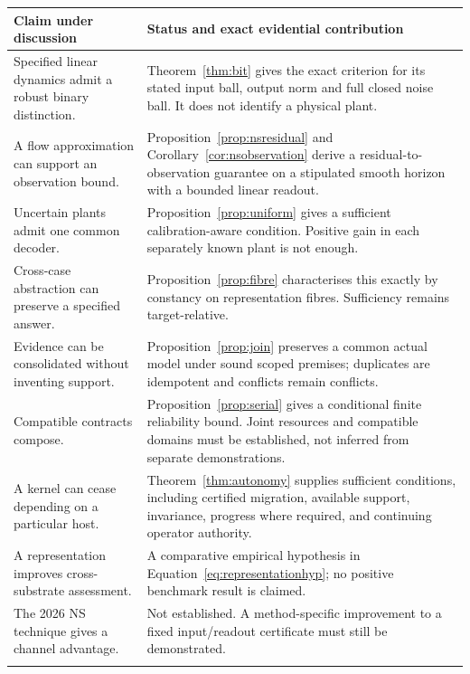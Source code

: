 \begingroup\small
\begin{longtable}{@{}>{\raggedright\arraybackslash}p{}>{\raggedright\arraybackslash}p{}@{}}
\toprule
Claim under discussion & Status and exact evidential contribution \\\midrule
\endhead
Specified linear dynamics admit a robust binary distinction. & Theorem~\ref{thm:bit} gives the exact criterion for its stated input ball, output norm and full closed noise ball. It does not identify a physical plant. \\\addlinespace
A flow approximation can support an observation bound. & Proposition~\ref{prop:nsresidual} and Corollary~\ref{cor:nsobservation} derive a residual-to-observation guarantee on a stipulated smooth horizon with a bounded linear readout. \\\addlinespace
Uncertain plants admit one common decoder. & Proposition~\ref{prop:uniform} gives a sufficient calibration-aware condition. Positive gain in each separately known plant is not enough. \\\addlinespace
Cross-case abstraction can preserve a specified answer. & Proposition~\ref{prop:fibre} characterises this exactly by constancy on representation fibres. Sufficiency remains target-relative. \\\addlinespace
Evidence can be consolidated without inventing support. & Proposition~\ref{prop:join} preserves a common actual model under sound scoped premises; duplicates are idempotent and conflicts remain conflicts. \\\addlinespace
Compatible contracts compose. & Proposition~\ref{prop:serial} gives a conditional finite reliability bound. Joint resources and compatible domains must be established, not inferred from separate demonstrations. \\\addlinespace
A kernel can cease depending on a particular host. & Theorem~\ref{thm:autonomy} supplies sufficient conditions, including certified migration, available support, invariance, progress where required, and continuing operator authority. \\\addlinespace
A representation improves cross-substrate assessment. & A comparative empirical hypothesis in Equation~\eqref{eq:representationhyp}; no positive benchmark result is claimed. \\\addlinespace
The 2026 NS technique gives a channel advantage. & Not established. A method-specific improvement to a fixed input/readout certificate must still be demonstrated. \\\addlinespace

\end{longtable}
